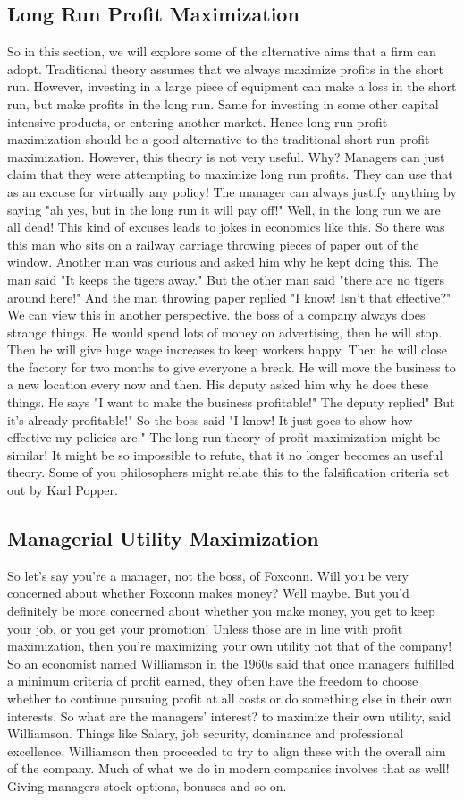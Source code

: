 \subsection{Long Run Profit Maximization}
 So in this section, we will explore some of the alternative aims that a firm can adopt. Traditional theory assumes that we always maximize profits in the short run. However, investing in a large piece of equipment can make a loss in the short run, but make profits in the long run. Same for investing in some other capital intensive products, or entering another market. Hence long run profit maximization should be a good alternative to the traditional short run profit maximization. However, this theory is not very useful. Why? Managers can just claim that they were attempting to maximize long run profits. They can use that as an excuse for virtually any policy! The manager can always justify anything by saying "ah yes, but in the long run it will pay off!" Well, in the long run we are all dead! This kind of excuses leads to jokes in economics like this. So there was this man who sits on a railway carriage throwing pieces of paper out of the window. Another man was curious and asked him why he kept doing this. The man said "It keeps the tigers away." But the other man said "there are no tigers around here!" And the man throwing paper replied "I know! Isn't that effective?" We can view this in another perspective. the boss of a company always does strange things. He would spend lots of money on advertising, then he will stop. Then he will give huge wage increases to keep workers happy. Then he will close the factory for two months to give everyone a break. He will move the business to a new location every now and then. His deputy asked him why he does these things. He says "I want to make the business profitable!" The deputy replied" But it's already profitable!" So the boss said "I know! It just goes to show how effective my policies are." The long run theory of profit maximization might be similar! It might be so impossible to refute, that it no longer becomes an useful theory. Some of you philosophers might relate this to the falsification criteria set out by Karl Popper. 
\subsection{Managerial Utility Maximization}
 So let's say you're a manager, not the boss, of Foxconn. Will you be very concerned about whether Foxconn makes money? Well maybe. But you'd definitely be more concerned about whether you make money, you get to keep your job, or you get your promotion! Unless those are in line with profit maximization, then you're maximizing your own utility not that of the company! So an economist named Williamson in the 1960s said that once managers fulfilled a minimum criteria of profit earned, they often have the freedom to choose whether to continue pursuing profit at all costs or do something else in their own interests. So what are the managers' interest? to maximize their own utility, said Williamson. Things like Salary, job security, dominance and professional excellence. Williamson then proceeded to try to align these with the overall aim of the company. Much of what we do in modern companies involves that as well! Giving managers stock options, bonuses and so on. 
